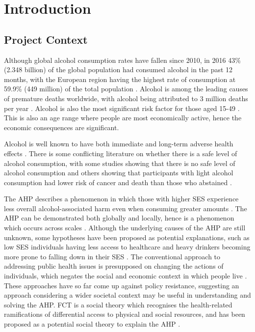 \chapter{Introduction}

\section*{Project Context}

Although global alcohol consumption rates have fallen since 2010, in 2016 43\% (2.348 billion) of the global population had consumed alcohol in the past 12 months, with the European region having the highest rate of consumption at 59.9\% (449 million) of the total population  \cite{WHOGlobalStatusReportFull}.
Alcohol is among the leading causes of premature deaths worldwide, with alcohol being attributed to 3 million deaths per year \cite{WHOGlobalStatusReportFull}. Alcohol is also the most significant risk factor for those aged 15-49 \cite{lancetAlcoholEditorial}. This is also an age range where people are most economically active, hence the economic consequences are significant.

Alcohol is well known to have both immediate and long-term adverse health effects \cite{fullAlcoholHarms}. There is some conflicting literature on whether there is a safe level of alcohol consumption, with some studies showing that there is no safe level of alcohol consumption and others showing that participants with light alcohol consumption had lower risk of cancer and death than those who abstained \cite{alcoholRiskThresholds, noDrinkvsSomeDrink}. 


The \ac{AHP} describes a phenomenon in which those with higher \ac{SES} experience less overall alcohol-associated harm even when consuming greater amounts \cite{unravellingAHP}. The \ac{AHP} can be demonstrated both globally and locally, hence is a phenomenon which occurs across scales \cite{WHOGlobalStatusReportFull, lancetAlcoholEditorial, englandAlcohol2021, scotlandAlcohol2022, ahp2016}. 
Although the underlying causes of the \ac{AHP} are still unknown, some hypotheses have been proposed as potential explanations, such as low \ac{SES} individuals having less access to healthcare and heavy drinkers becoming more prone to falling down in their \ac{SES} \cite{ahpInterventions}. The conventional approach to addressing public health issues is presupposed on changing the actions of individuals, which negates the social and economic context in which people live \cite{csHealthDisparities, sdhInterventions, FCTorigin}. These approaches have so far come up against policy resistance, suggesting an approach considering a wider societal context may be useful in understanding and solving the \ac{AHP}. 
\ac{FCT} is a social theory which recognises the health-related ramifications of differential access to physical and social resources, and has been proposed as a potential social theory to explain the \ac{AHP} \cite{FCTorigin, Boyd2021}.

